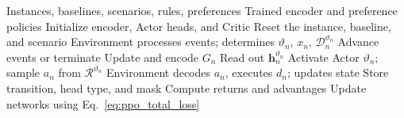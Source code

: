 
\begin{algorithm}[t]
\caption{Multi-head rule-selection training}
\label{alg:training}
\small
\begin{algorithmic}[1]
\Require Instances, baselines, scenarios, rules, preferences
\Ensure Trained encoder and preference policies
 \State Initialize encoder, Actor heads, and Critic
  \State Reset the instance, baseline, and scenario
   \State Environment processes events; determines $\vartheta_n$, $x_n$, $\mathcal D_n^{\vartheta_n}$
    \State Advance events or terminate
   \Else
    \State Update and encode $G_n$
    \State Read out $\boldsymbol{h}_n^{\vartheta_n}$
    \State Activate Actor $\vartheta_n$; sample $a_n$ from $\mathcal R^{\vartheta_n}$
    \State Environment decodes $a_n$, executes $d_n$; updates state
    \State Store transition, head type, and mask
   \EndIf
  \EndWhile
  \State Compute returns and advantages
  \State Update networks using Eq.~\eqref{eq:ppo_total_loss}
 \EndFor
\EndFor
\end{algorithmic}
\end{algorithm}

